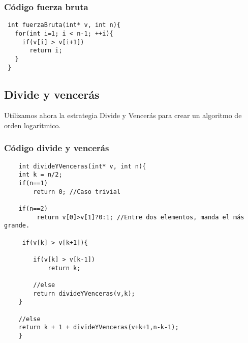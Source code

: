 \documentclass[compress]{beamer}
\begin{document}
\begin{frame}[fragile]
	\frametitle{Código fuerza bruta}
 \begin{lstlisting}
 int fuerzaBruta(int* v, int n){
   for(int i=1; i < n-1; ++i){
     if(v[i] > v[i+1])
       return i;
   }
 }
 \end{lstlisting}
\end{frame}

\subsection{Divide y vencerás}
\begin{frame}
        Utilizamos ahora la estrategia Divide y Vencerás para crear un algoritmo
de orden logarítmico.\\

\end{frame}
\newlength\someheight
\setlength\someheight{3.5cm}

\begin{frame}[fragile]
\frametitle{Código divide y vencerás}
\begin{center}
 \begin{adjustbox}{width=\textwidth,height=\someheight,keepaspectratio}
 	\begin{lstlisting}
 	int divideYVenceras(int* v, int n){
 	int k = n/2;
 	if(n==1)
	 	return 0; //Caso trivial
 	
 	if(n==2)
	 	 return v[0]>v[1]?0:1; //Entre dos elementos, manda el más grande.
 	
	 if(v[k] > v[k+1]){

 		if(v[k] > v[k-1]) 
	 		return k;
 		
	 	//else
 		return divideYVenceras(v,k);
 	}
 		
 	//else
 	return k + 1 + divideYVenceras(v+k+1,n-k-1);
 	}
 		\end{lstlisting}
 		\end{adjustbox}
 		\end{center}
\end{frame}
\end{document}
